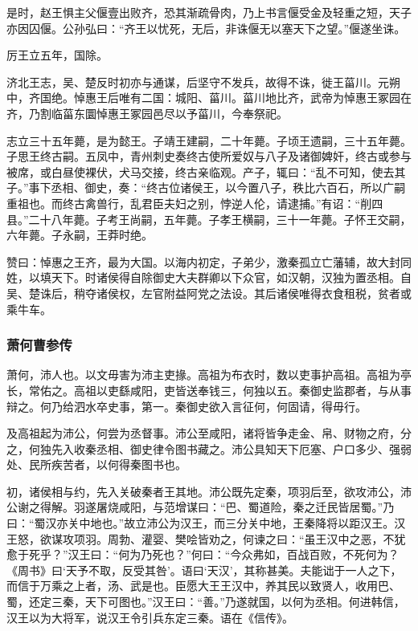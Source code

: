 \documentclass[]{article}
\begin{document}
是时，赵王惧主父偃壹出败齐，恐其渐疏骨肉，乃上书言偃受金及轻重之短，天子亦因囚偃。公孙弘曰：``齐王以忧死，无后，非诛偃无以塞天下之望。''偃遂坐诛。

厉王立五年，国除。

济北王志，吴、楚反时初亦与通谋，后坚守不发兵，故得不诛，徙王菑川。元朔中，齐国绝。悼惠王后唯有二国：城阳、菑川。菑川地比齐，武帝为悼惠王冢园在齐，乃割临菑东圜悼惠王冢园邑尽以予菑川，今奉祭祀。

志立三十五年薨，是为懿王。子靖王建嗣，二十年薨。子顷王遗嗣，三十五年薨。子思王终古嗣。五凤中，青州刺史奏终古使所爱奴与八子及诸御婢奸，终古或参与被席，或白昼使裸伏，犬马交接，终古亲临观。产子，辄曰：``乱不可知，使去其子。''事下丞相、御史，奏：``终古位诸侯王，以今置八子，秩比六百石，所以广嗣重祖也。而终古禽兽行，乱君臣夫妇之别，悖逆人伦，请逮捕。''有诏：``削四县。''二十八年薨。子考王尚嗣，五年薨。子孝王横嗣，三十一年薨。子怀王交嗣，六年薨。子永嗣，王莽时绝。

赞曰：悼惠之王齐，最为大国。以海内初定，子弟少，激秦孤立亡藩辅，故大封同姓，以填天下。时诸侯得自除御史大夫群卿以下众官，如汉朝，汉独为置丞相。自吴、楚诛后，稍夺诸侯权，左官附益阿党之法设。其后诸侯唯得衣食租税，贫者或乘牛车。

\hypertarget{header-n3730}{%
\subsubsection{萧何曹参传}\label{header-n3730}}

萧何，沛人也。以文毋害为沛主吏掾。高祖为布衣时，数以吏事护高祖。高祖为亭长，常佑之。高祖以吏繇咸阳，吏皆送奉钱三，何独以五。秦御史监郡者，与从事辩之。何乃给泗水卒史事，第一。秦御史欲入言征何，何固请，得毋行。

及高祖起为沛公，何尝为丞督事。沛公至咸阳，诸将皆争走金、帛、财物之府，分之，何独先入收秦丞相、御史律令图书藏之。沛公具知天下厄塞、户口多少、强弱处、民所疾苦者，以何得秦图书也。

初，诸侯相与约，先入关破秦者王其地。沛公既先定秦，项羽后至，欲攻沛公，沛公谢之得解。羽遂屠烧咸阳，与范增谋曰：``巴、蜀道险，秦之迁民皆居蜀。''乃曰：``蜀汉亦关中地也。''故立沛公为汉王，而三分关中地，王秦降将以距汉王。汉王怒，欲谋攻项羽。周勃、灌婴、樊哙皆劝之，何谏之曰：``虽王汉中之恶，不犹愈于死乎？''汉王曰：``何为乃死也？''何曰：``今众弗如，百战百败，不死何为？《周书》曰`天予不取，反受其咎'。语曰`天汉'，其称甚美。夫能诎于一人之下，而信于万乘之上者，汤、武是也。臣愿大王王汉中，养其民以致贤人，收用巴、蜀，还定三秦，天下可图也。''汉王曰：``善。''乃遂就国，以何为丞相。何进韩信，汉王以为大将军，说汉王令引兵东定三秦。语在《信传》。
\end{document}

